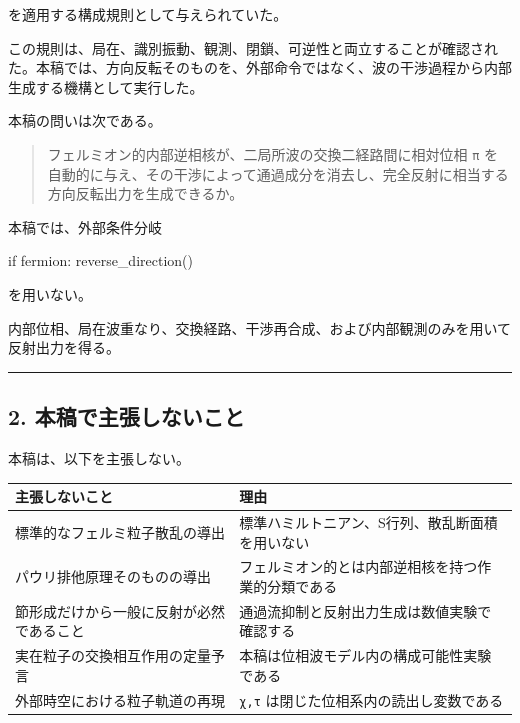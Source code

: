 \documentclass[
  a4paper,
]{article}
\newenvironment{Shaded}{}{}
\newcommand{\NormalTok}[1]{#1}
\newcounter{none} %
\begin{document}
を適用する構成規則として与えられていた。

この規則は、局在、識別振動、観測、閉鎖、可逆性と両立することが確認された。本稿では、方向反転そのものを、外部命令ではなく、波の干渉過程から内部生成する機構として実行した。

本稿の問いは次である。

\begin{quote}
フェルミオン的内部逆相核が、二局所波の交換二経路間に相対位相 \texttt{π}
を自動的に与え、その干渉によって通過成分を消去し、完全反射に相当する方向反転出力を生成できるか。
\end{quote}

本稿では、外部条件分岐

\begin{Shaded}
\begin{Highlighting}[]
\NormalTok{if fermion:}
\NormalTok{    reverse\_direction()}
\end{Highlighting}
\end{Shaded}

を用いない。

内部位相、局在波重なり、交換経路、干渉再合成、および内部観測のみを用いて反射出力を得る。

\begin{center}\rule{0.5\linewidth}{0.5pt}\end{center}

\subsection{2.
本稿で主張しないこと}\label{ux672cux7a3fux3067ux4e3bux5f35ux3057ux306aux3044ux3053ux3068}

本稿は、以下を主張しない。

{\def\LTcaptype{none} %
\begin{longtable}[]{@{}
  >{\raggedright\arraybackslash}p{}
  >{\raggedright\arraybackslash}p{}@{}}
\toprule\noalign{}
\begin{minipage}[b]{\linewidth}\raggedright
主張しないこと
\end{minipage} & \begin{minipage}[b]{\linewidth}\raggedright
理由
\end{minipage} \\
\midrule\noalign{}
\endhead
\bottomrule\noalign{}
\endlastfoot
標準的なフェルミ粒子散乱の導出 &
標準ハミルトニアン、S行列、散乱断面積を用いない \\
パウリ排他原理そのものの導出 &
フェルミオン的とは内部逆相核を持つ作業的分類である \\
節形成だけから一般に反射が必然であること &
通過流抑制と反射出力生成は数値実験で確認する \\
実在粒子の交換相互作用の定量予言 &
本稿は位相波モデル内の構成可能性実験である \\
外部時空における粒子軌道の再現 & \texttt{χ,τ}
は閉じた位相系内の読出し変数である \\
\end{longtable}
}
\end{document}
